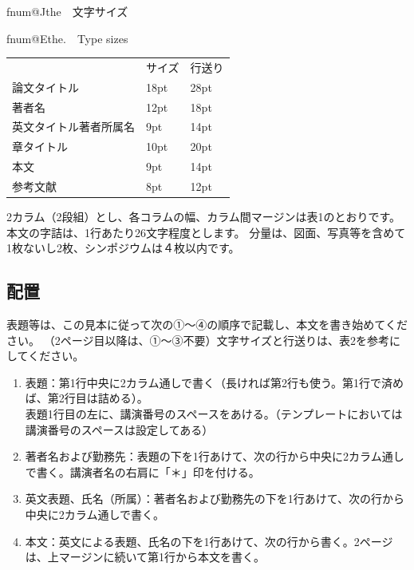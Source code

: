 \documentclass[uplatex,dvipdfmx,ja=standard,twocolumn]{bxjsarticle}
\makeatletter
\newcommand{\ieejcaption}[2]{%
\stepcounter{\@captype}
\par
\fontsize{8pt}{0pt}\selectfont
\csname fnum@J\@captype\endcsname \csname the\@captype\endcsname　#1\par
\csname fnum@E\@captype\endcsname \csname the\@captype\endcsname.　#2\par
}
\makeatother
\begin{document}
\vspace{-13pt}

\begin{table}[h]
  \fontsize{8pt}{10pt}\selectfont
  \centering
  \ieejcaption{文字サイズ}{Type sizes}
  \begin{tabular}{lll}
    \hline
                           & サイズ & 行送り\\
    論文タイトル           & 18pt   & 28pt\\
    著者名                 & 12pt   & 18pt\\
    英文タイトル著者所属名 &  9pt   & 14pt\\
    章タイトル             & 10pt   & 20pt\\
    本文                   &  9pt   & 14pt\\
    参考文献               &  8pt   & 12pt\\
    \hline
  \end{tabular}
\end{table}

\vspace{-10pt}

2カラム（2段組）とし、各コラムの幅、カラム間マージンは表1のとおりです。
本文の字詰は、1行あたり26文字程度とします。
分量は、図面、写真等を含めて1枚ないし2枚、シンポジウムは４枚以内です。

\subsection{配置}

表題等は、この見本に従って次の①～④の順序で記載し、本文を書き始めてください。
（2ページ目以降は、①～③不要）文字サイズと行送りは、表2を参考にしてください。

\begin{enumerate}[m]
  \item 表題：第1行中央に2カラム通しで書く（長ければ第2行も使う。第1行で済めば、第2行目は詰める）。\\表題1行目の左に、講演番号のスペースをあける。（テンプレートにおいては講演番号のスペースは設定してある）
  \item 著者名および勤務先：表題の下を1行あけて、次の行から中央に2カラム通しで書く。講演者名の右肩に「＊」印を付ける。
  \item 英文表題、氏名（所属）：著者名および勤務先の下を1行あけて、次の行から中央に2カラム通しで書く。
  \item 本文：英文による表題、氏名の下を1行あけて、次の行から書く。2ページは、上マージンに続いて第1行から本文を書く。
\end{enumerate}
\end{document}
